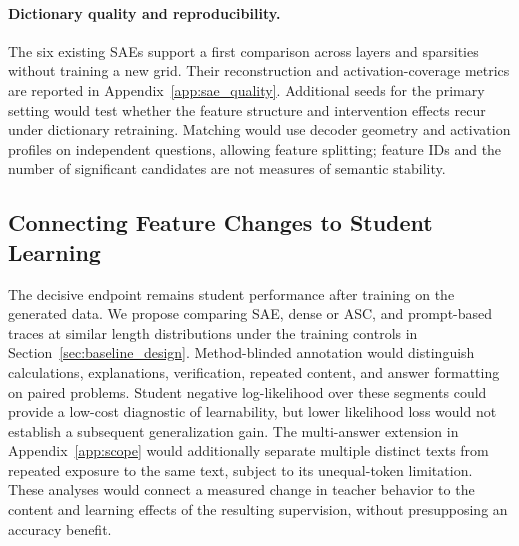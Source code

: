 \paragraph{Dictionary quality and reproducibility.}
The six existing SAEs support a first comparison across layers and sparsities without training a new grid.
Their reconstruction and activation-coverage metrics are reported in Appendix~\ref{app:sae_quality}.
Additional seeds for the primary setting would test whether the feature structure and intervention effects recur under dictionary retraining.
Matching would use decoder geometry and activation profiles on independent questions, allowing feature splitting; feature IDs and the number of significant candidates are not measures of semantic stability.

\subsection{Connecting Feature Changes to Student Learning}
\label{sec:sae_student_link}

The decisive endpoint remains student performance after training on the generated data.
We propose comparing SAE, dense or ASC, and prompt-based traces at similar length distributions under the training controls in Section~\ref{sec:baseline_design}.
Method-blinded annotation would distinguish calculations, explanations, verification, repeated content, and answer formatting on paired problems.
Student negative log-likelihood over these segments could provide a low-cost diagnostic of learnability, but lower likelihood loss would not establish a subsequent generalization gain.
The multi-answer extension in Appendix~\ref{app:scope} would additionally separate multiple distinct texts from repeated exposure to the same text, subject to its unequal-token limitation.
These analyses would connect a measured change in teacher behavior to the content and learning effects of the resulting supervision, without presupposing an accuracy benefit.
